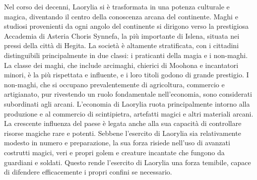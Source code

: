 \documentclass[10pt, a4paper]{report}
\begin{document}
\begin{multicols}{2}
Nel corso dei decenni, Laorylia si è trasformata in una potenza culturale e magica, diventando il centro della conoscenza arcana del continente. Maghi e studiosi provenienti da ogni angolo del continente si dirigono verso la prestigiosa Accademia di Asteria Choris Synnefa, la più importante di Islena, situata nei pressi della città di Hegita. La società è altamente stratificata, con i cittadini distinguibili principalmente in due classi: i praticanti della magia e i non-maghi. La classe dei maghi, che include arcimaghi, chierici di Moohona e incantatori minori, è la più rispettata e influente, e i loro titoli godono di grande prestigio. I non-maghi, che si occupano prevalentemente di agricoltura, commercio e artigianato, pur rivestendo un ruolo fondamentale nell’economia, sono considerati subordinati agli arcani.
L’economia di Laorylia ruota principalmente intorno alla produzione e al commercio di scintipietra, artefatti magici e altri materiali arcani. La crescente influenza del paese è legata anche alla sua capacità di controllare risorse magiche rare e potenti. Sebbene l’esercito di Laorylia sia relativamente modesto in numero e preparazione, la sua forza risiede nell’uso di avanzati costrutti magici, veri e propri golem e creature incantate che fungono da guardiani e soldati. Questo rende l’esercito di Laorylia una forza temibile, capace di difendere efficacemente i propri confini se necessario.


\end{multicols}
\end{document}
